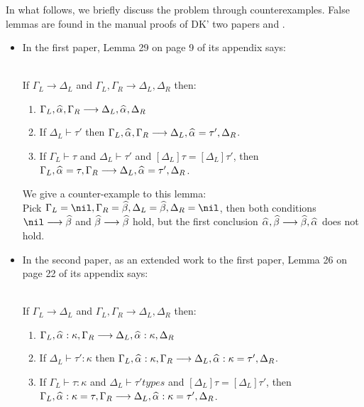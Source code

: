 In what follows, we briefly discuss the problem through counterexamples.
False lemmas are found in the manual proofs of DK' two papers
\citep{dunfield2013complete} and \citep{DunfieldIndexed}.
\begin{itemize}
    \item
        In the first paper, Lemma 29 on page 9 of its appendix says:
        \begin{lemma}~\\
        If $\Gamma_L \longrightarrow \Delta_L$ and
        $\Gamma_L, \Gamma_R \longrightarrow \Delta_L, \Delta_R$ then:
        \begin{enumerate}
            \item $\Gamma_L,\al,\Gamma_R \longrightarrow \Delta_L, \al, \Delta_R$
            \item If $\Delta_L \vdash \tau'$ then
                $\Gamma_L,\al,\Gamma_R \longrightarrow \Delta_L, \al = \tau', \Delta_R$.
            \item If $\Gamma_L \vdash \tau$ and $\Delta_L \vdash \tau'$ and
                $[\Delta_L]\tau = [\Delta_L]\tau'$, then
                $\Gamma_L, \al = \tau, \Gamma_R \longrightarrow \Delta_L, \al = \tau', \Delta_R$.
        \end{enumerate}
        \end{lemma}

        We give a counter-example to this lemma:\\
        Pick $\Gm_L = \nil, \Gm_R = \bt, \Delta_L = \bt, \Delta_R = \nil$, then both conditions
        $\nil\longrightarrow \bt$ and $\bt\longrightarrow \bt$ hold, but the first conclusion
        $\al,\bt \longrightarrow \bt,\al$ does not hold.
    \item
        In the second paper, as an extended work to the first paper, Lemma 26 on page 22 of its appendix says:
        \begin{lemma}~\\
        If $\Gamma_L \longrightarrow \Delta_L$ and
        $\Gamma_L, \Gamma_R \longrightarrow \Delta_L, \Delta_R$ then:
        \begin{enumerate}
            \item $\Gamma_L,\al:\kappa,\Gamma_R \longrightarrow \Delta_L, \al:\kappa, \Delta_R$
            \item If $\Delta_L \vdash \tau' : \kappa$ then
                $\Gamma_L,\al:\kappa,\Gamma_R \longrightarrow \Delta_L, \al:\kappa = \tau', \Delta_R$.
            \item If $\Gamma_L \vdash \tau : \kappa$ and $\Delta_L \vdash \tau' types$ and
                $[\Delta_L]\tau = [\Delta_L]\tau'$, then
                $\Gamma_L, \al:\kappa = \tau, \Gamma_R \longrightarrow \Delta_L, \al:\kappa = \tau', \Delta_R$.
        \end{enumerate}
        \end{lemma}
        

\end{itemize}
